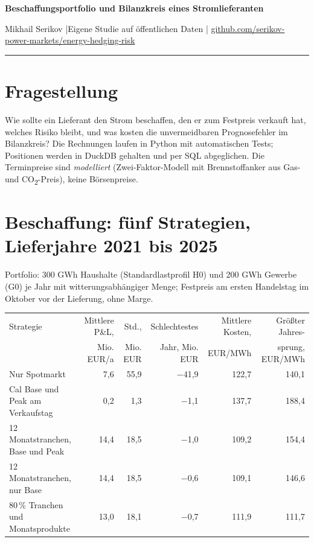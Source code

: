 \documentclass[10pt,a4paper]{article}
\begin{document}
{\LARGE\bfseries\color{kopf} Beschaffungsportfolio und Bilanzkreis eines Stromlieferanten}\par
\vspace{1pt}
Mikhail Serikov \quad|\quad Eigene Studie auf öffentlichen Daten \quad|\quad
\href{https://github.com/serikov-power-markets/energy-hedging-risk}{github.com/serikov-power-markets/energy-hedging-risk}\par
\vspace{2pt}\hrule

\section{Fragestellung}
Wie sollte ein Lieferant den Strom beschaffen, den er zum Festpreis verkauft hat, welches Risiko bleibt, und was
kosten die unvermeidbaren Prognosefehler im Bilanzkreis? Die Rechnungen laufen in Python mit automatischen Tests;
Positionen werden in DuckDB gehalten und per SQL abgeglichen. Die Terminpreise sind \emph{modelliert}
(Zwei-Faktor-Modell mit Brennstoffanker aus Gas- und CO\textsubscript{2}-Preis), keine Börsenpreise.

\section{Beschaffung: fünf Strategien, Lieferjahre 2021 bis 2025}
Portfolio: 300 GWh Haushalte (Standardlastprofil H0) und 200 GWh Gewerbe (G0) je Jahr mit witterungsabhängiger Menge;
Festpreis am ersten Handelstag im Oktober vor der Lieferung, ohne Marge.

\begin{tabularx}{\textwidth}{@{}Xrrrrr@{}}
\toprule
Strategie & Mittlere P\&L, & Std., & Schlechtestes & Mittlere Kosten, & Größter Jahres- \\
 & Mio. EUR/a & Mio. EUR & Jahr, Mio. EUR & EUR/MWh & sprung, EUR/MWh \\
\midrule
Nur Spotmarkt & 7,6 & 55,9 & $-$41,9 & 122,7 & 140,1 \\
Cal Base und Peak am Verkaufstag & 0,2 & 1,3 & $-$1,1 & 137,7 & 188,4 \\
12 Monatstranchen, Base und Peak & 14,4 & 18,5 & $-$1,0 & 109,2 & 154,4 \\
12 Monatstranchen, nur Base & 14,4 & 18,5 & $-$0,6 & 109,1 & 146,6 \\
80\,\% Tranchen und Monatsprodukte & 13,0 & 18,1 & $-$0,7 & 111,9 & 111,7 \\
\bottomrule
\end{tabularx}
\end{document}
